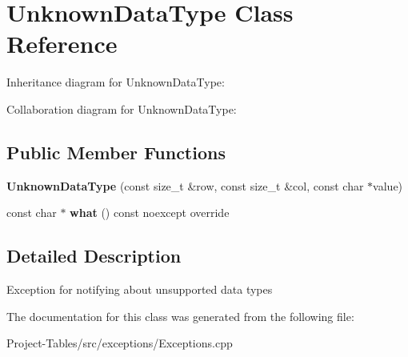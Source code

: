 \hypertarget{classUnknownDataType}{}\section{Unknown\+Data\+Type Class Reference}
\label{classUnknownDataType}


Inheritance diagram for Unknown\+Data\+Type\+:


Collaboration diagram for Unknown\+Data\+Type\+:
\subsection*{Public Member Functions}
\begin{DoxyCompactItemize}
\item 
\mbox{\label{classUnknownDataType_aa8ce258e2f5420999fb8f88cf6c9c314}} 
{\bfseries Unknown\+Data\+Type} (const size\+\_\+t \&row, const size\+\_\+t \&col, const char $\ast$value)
\item 
\mbox{\label{classUnknownDataType_a623877b16dd0846285f4e8b66987ea03}} 
const char $\ast$ {\bfseries what} () const noexcept override
\end{DoxyCompactItemize}


\subsection{Detailed Description}
Exception for notifying about unsupported data types 

The documentation for this class was generated from the following file\+:\begin{DoxyCompactItemize}
\item 
Project-\/\+Tables/src/exceptions/Exceptions.\+cpp\end{DoxyCompactItemize}
